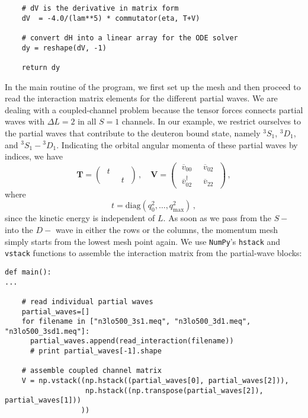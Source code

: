 {\begin{lstlisting}
    # dV is the derivative in matrix form 
    dV  = -4.0/(lam**5) * commutator(eta, T+V)

    # convert dH into a linear array for the ODE solver
    dy = reshape(dV, -1)
      
    return dy
\end{lstlisting}

In the main routine of the program, we first set up the mesh and 
then proceed to read the interaction matrix elements for the 
different partial waves.
We are dealing with a coupled-channel problem because
the tensor forces connects partial waves with $\Delta L=2$
in all $S=1$ channels. In our example, we restrict ourselves
to the partial waves that contribute to the deuteron bound
state, namely ${}^3S_1$, ${}^3D_1$,
and ${}^3S_1-{}^3D_1$. Indicating the orbital angular momenta
of these partial waves by indices, we have
\begin{equation}
  \mathbf{T}=
  \begin{pmatrix} 
      \;t\; &   \\
        &  \;t\;
  \end{pmatrix}\,,
  \quad
  \mathbf{V}=
  \begin{pmatrix} 
      \;\overline{v}_{00}\;       &  \;\overline{v}_{02}\; \\
      \;\overline{v}^\dag_{02}\;  &  \;\overline{v}_{22}\;
  \end{pmatrix}\,,
\end{equation}
where 
\begin{equation}
  t = \mathrm{diag}\left(q_0^2,\ldots,q_\text{max}^2\right)\,,
\end{equation}
since the kinetic energy is independent of $L$. As soon as we pass 
from the $S-$ into the $D-$ wave in either the
rows or the columns, the momentum mesh simply starts from the
lowest mesh point again. We use \texttt{NumPy}'s \texttt{hstack} 
and \texttt{vstack} functions to assemble the interaction matrix
from the partial-wave blocks:

\begin{lstlisting}
def main():
...  

    # read individual partial waves
    partial_waves=[]
    for filename in ["n3lo500_3s1.meq", "n3lo500_3d1.meq", "n3lo500_3sd1.meq"]:
      partial_waves.append(read_interaction(filename))
      # print partial_waves[-1].shape

    # assemble coupled channel matrix
    V = np.vstack((np.hstack((partial_waves[0], partial_waves[2])), 
                   np.hstack((np.transpose(partial_waves[2]), partial_waves[1]))
                  ))


\end{lstlisting}}
